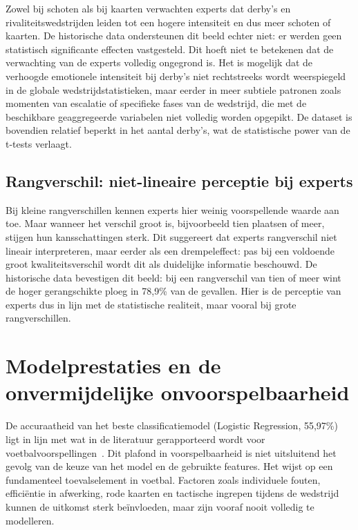Zowel bij schoten als bij kaarten verwachten experts dat derby's en rivaliteitswedstrijden leiden
tot een hogere intensiteit en dus meer schoten of kaarten.
De historische data ondersteunen dit beeld echter niet: er werden geen statistisch significante effecten vastgesteld.
Dit hoeft niet te betekenen dat de verwachting van de experts volledig ongegrond is.
Het is mogelijk dat de verhoogde emotionele intensiteit bij derby's niet rechtstreeks wordt weerspiegeld
in de globale wedstrijdstatistieken, maar eerder in meer subtiele patronen
zoals momenten van escalatie of specifieke fases van de wedstrijd, die met de beschikbare geaggregeerde variabelen niet volledig worden opgepikt.
De dataset is bovendien relatief beperkt in het aantal derby's, wat de statistische power van de t-tests verlaagt.

\subsection{Rangverschil: niet-lineaire perceptie bij experts}

Bij kleine rangverschillen kennen experts hier weinig voorspellende waarde aan toe.
Maar wanneer het verschil groot is, bijvoorbeeld tien plaatsen of meer, stijgen hun kansschattingen sterk.
Dit suggereert dat experts rangverschil niet lineair interpreteren, maar eerder als een drempeleffect:
pas bij een voldoende groot kwaliteitsverschil wordt dit als duidelijke informatie beschouwd.
De historische data bevestigen dit beeld: bij een rangverschil van tien of meer wint de hoger gerangschikte ploeg
in 78,9\% van de gevallen. Hier is de perceptie van experts dus in lijn met de statistische realiteit,
maar vooral bij grote rangverschillen.

\section{Modelprestaties en de onvermijdelijke onvoorspelbaarheid}

De accuraatheid van het beste classificatiemodel (Logistic Regression, 55,97\%) ligt in lijn met wat in de literatuur
gerapporteerd wordt voor voetbalvoorspellingen~\autocite{beal2021football}.
Dit plafond in voorspelbaarheid is niet uitsluitend het gevolg van de keuze van het model en de gebruikte features. 
Het wijst op een fundamenteel toevalselement in voetbal. Factoren zoals individuele fouten, efficiëntie in afwerking, 
rode kaarten en tactische ingrepen tijdens de wedstrijd kunnen de uitkomst sterk beïnvloeden, maar zijn vooraf nooit volledig te modelleren.

